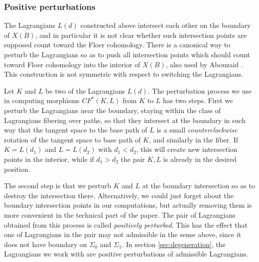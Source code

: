 \documentclass[12pt]{amsart}
\begin{document}



\subsubsection{Positive perturbations}
\label{sec:pert}
The Lagrangians $L(d)$ constructed above intersect each other on the
boundary of $X(B)$, and in particular it is not clear whether such
intersection points are supposed count toward the Floer
cohomology. There is a canonical way to perturb the Lagrangians so as
to push all intersection points which should count toward Floer
cohomology into the interior of $X(B)$, also used by Abouzaid
\cite{abouzaid06}. This construction is not
symmetric with respect to switching the Lagrangians. 

Let $K$ and $L$ be two of the Lagrangians $L(d)$. The perturbation
process we use in computing morphisms $CF^*(K,L)$ from $K$ to $L$ has two
steps. First we perturb the Lagrangians near the boundary, staying
within the class of Lagrangians fibering over paths, so that they
intersect at the boundary in such way that the tangent space to the base path of $L$ is a small \emph{counterclockwise} rotation of the tangent space to base path of $K$, and similarly in the fiber. If $K = L(d_1)$ and $L = L(d_2)$ with $d_1 < d_2$, this will create new intersection points in the interior, while if $d_1 > d_2$ the pair $K,L$ is already in the desired position.

The second step is that we perturb $K$ and $L$ at the boundary intersection so as to destroy the intersection there. Alternatively, we could just forget about the boundary intersection points in our computations, but actually removing them is more convenient in the technical part of the paper.
 The pair of
Lagrangians obtained from this process is called \emph{positively
  perturbed}. This has the effect that one of Lagrangians in the pair
may not admissible in the sense above, since it does not have boundary
on $\Sigma_0$ and $\Sigma_1$. In section \ref{sec:degeneration}, the
Lagrangians we work with are positive perturbations of admissible
Lagrangians.
\end{document}
